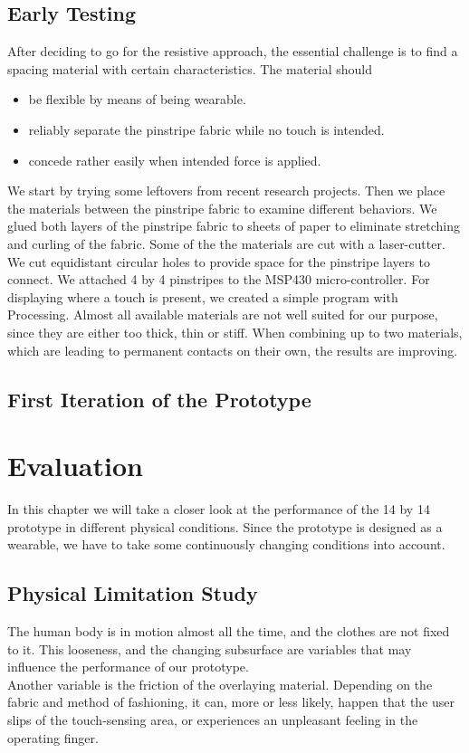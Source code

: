 \section{Early Testing}
After deciding to go for the resistive approach, the essential challenge is to find a spacing material with certain characteristics. The material should
\begin{itemize}
\item be flexible by means of being wearable.
\item reliably separate the pinstripe fabric while no touch is intended.
\item concede rather easily when intended force is applied.
\end{itemize}
We start by trying some leftovers from recent research projects. 
Then we place the materials between the pinstripe fabric to examine different behaviors. We glued both layers of the pinstripe fabric to sheets of paper to eliminate stretching and curling of the fabric. Some of the the materials are cut with a laser-cutter. We cut equidistant circular holes to provide space for the pinstripe layers to connect. We attached 4 by 4 pinstripes to the MSP430 micro-controller. For displaying where a touch is present, we created a simple program with Processing.
Almost all available materials are not well suited for our purpose, since they are either too thick, thin or stiff. When combining up to two materials, which are leading to permanent contacts on their own, the results are improving. 
\section{First Iteration of the Prototype}



\chapter{Evaluation}
In this chapter we will take a closer look at the performance of the 14 by 14 prototype in different physical conditions. Since the prototype is designed as a wearable, we have to take some  continuously changing conditions into account.  

\section{Physical Limitation Study}
The human body is in motion almost all the time, and the clothes are not fixed to it. This looseness, and the changing subsurface are variables that may influence the performance of our prototype. \\
Another variable is the friction of the overlaying material. Depending on the fabric and method of fashioning, it can, more or less likely, happen that the user slips of the touch-sensing area, or experiences an unpleasant feeling in the operating finger. 

